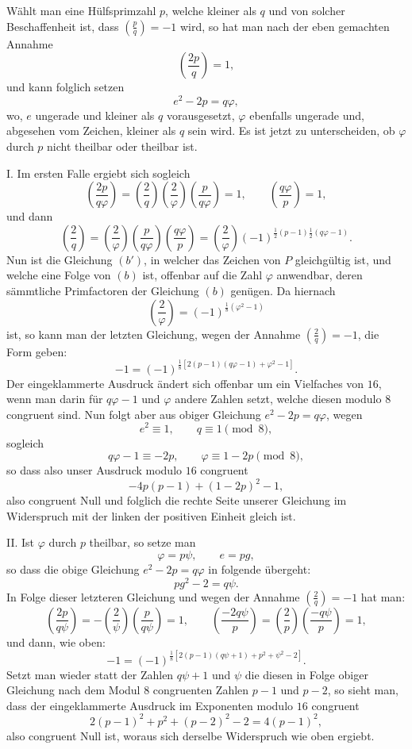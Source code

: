 \documentclass[11pt]{article}
\newcommand{\J}[2]{\left(\frac{#1}{#2}\right)}
\begin{document}
Wählt man eine Hülfsprimzahl $p$, welche kleiner als $q$ und von solcher Beschaffenheit ist, dass $\J{p}{q}=-1$ wird, so hat man nach der eben gemachten Annahme
\[
 \J{2p}{q}=1,
\]
und kann folglich setzen
\[
 e^2-2p=q\varphi,
\]
wo, $e$ ungerade und kleiner als $q$ vorausgesetzt, $\varphi$ ebenfalls ungerade und, abgesehen vom Zeichen, kleiner als $q$ sein wird. Es ist jetzt zu unterscheiden, ob $\varphi$ durch $p$ nicht theilbar oder theilbar ist.

I. Im ersten Falle ergiebt sich sogleich
\[
 \J{2p}{q\varphi}=\J{2}{q}\J{2}{\varphi}\J{p}{q\varphi}=1,
\qquad
 \J{q\varphi}{p}=1,
\]
und dann
\[
 \J{2}{q}=\J{2}{\varphi}\J{p}{q\varphi}\J{q\varphi}{p}
 =\J{2}{\varphi}(-1)^{\frac12(p-1)\frac12(q\varphi-1)}.
\]
Nun ist die Gleichung $(b')$, in welcher das Zeichen von $P$ gleichgültig ist, und welche eine Folge von $(b)$ ist, offenbar auf die Zahl $\varphi$ anwendbar, deren sämmtliche Primfactoren der Gleichung $(b)$ genügen. Da hiernach
\[
 \J{2}{\varphi}=(-1)^{\frac18(\varphi^2-1)}
\]
ist, so kann man der letzten Gleichung, wegen der Annahme $\J{2}{q}=-1$, die Form geben:
\[
 -1=(-1)^{\frac18[2(p-1)(q\varphi-1)+\varphi^2-1]}.
\]
Der eingeklammerte Ausdruck ändert sich offenbar um ein Vielfaches von $16$, wenn man darin für $q\varphi-1$ und $\varphi$ andere Zahlen setzt, welche diesen modulo $8$ congruent sind. Nun folgt aber aus obiger Gleichung $e^2-2p=q\varphi$, wegen
\[
 e^2\equiv1,
\qquad q\equiv1\pmod 8,
\]
sogleich
\[
 q\varphi-1\equiv -2p,
\qquad \varphi\equiv1-2p\pmod 8,
\]
so dass also unser Ausdruck modulo $16$ congruent
\[
 -4p(p-1)+(1-2p)^2-1,
\]
also congruent Null und folglich die rechte Seite unserer Gleichung im Widerspruch mit der linken der positiven Einheit gleich ist.

II. Ist $\varphi$ durch $p$ theilbar, so setze man
\[
 \varphi=p\psi,
\qquad e=pg,
\]
so dass die obige Gleichung $e^2-2p=q\varphi$ in folgende übergeht:
\[
 pg^2-2=q\psi.
\]
In Folge dieser letzteren Gleichung und wegen der Annahme $\J{2}{q}=-1$ hat man:
\[
 \J{2p}{q\psi}=-\J{2}{\psi}\J{p}{q\psi}=1,
\qquad
 \J{-2q\psi}{p}=\J{2}{p}\J{-q\psi}{p}=1,
\]
und dann, wie oben:
\[
 -1=(-1)^{\frac18[2(p-1)(q\psi+1)+p^2+\psi^2-2]}.
\]
Setzt man wieder statt der Zahlen $q\psi+1$ und $\psi$ die diesen in Folge obiger Gleichung nach dem Modul $8$ congruenten Zahlen $p-1$ und $p-2$, so sieht man, dass der eingeklammerte Ausdruck im Exponenten modulo $16$ congruent
\[
 2(p-1)^2+p^2+(p-2)^2-2=4(p-1)^2,
\]
also congruent Null ist, woraus sich derselbe Widerspruch wie oben ergiebt.
\end{document}
